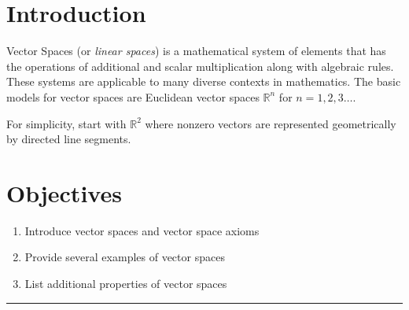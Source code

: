 %
\section*{Introduction}

Vector Spaces (or \textit{linear spaces}) is a mathematical system of elements that has the operations of additional and scalar multiplication along with algebraic rules.  These systems are applicable to many diverse contexts in mathematics.   The basic models for vector spaces are Euclidean vector spaces $\mathbb{R}^n$ for $n=1, 2, 3 \dots$.  

For simplicity, start with $\mathbb{R}^2$ where nonzero vectors are represented geometrically by directed line segments.
\section*{Objectives}
\begin{enumerate}
	\item Introduce vector spaces and vector space axioms
	\item Provide several examples of vector spaces
	\item List additional properties of vector spaces   
\end{enumerate}



 
 
  

\rule[0.01in]{\textwidth}{0.0025in}


 

 

